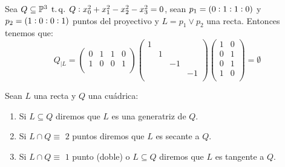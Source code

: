 \begin{example}
  Sea $Q\subseteq \mathbb{P}^3 \operatorname{\;t.q.\;} Q:x^2_0 +x^2_1 -x^2_2-x^2_3=0$, sean $p_1=\left( 0:1:1:0\right)$ y $p_2=\left( 
  1:0:0:1\right)$ puntos del proyectivo y $L=p_1 \vee p_2$ una recta. Entonces tenemos que:
  \[
    Q_{|L}=
    \begin{pmatrix}
      0 & 1 & 1 & 0\\
      1 & 0 & 0 & 1\\
    \end{pmatrix}
    \begin{pmatrix}
      1 & & &\\
      & 1 & &\\
      & & -1 &\\
      & & & -1\\
    \end{pmatrix}
    \begin{pmatrix}
      1 & 0\\
      0 & 1\\
      0 & 1\\
      1 & 0\\
    \end{pmatrix}
    =\emptyset
  \]
  \label{exampleLinQ}
\end{example}

\begin{defi}  
  Sean $L$ una recta y $Q$ una cuádrica:
  \begin{enumerate}[(1)]
    \item Si $L\subseteq Q$ diremos que $L$ es una generatriz de $Q$.
    \item Si $L\cap Q \equiv$ $2$ puntos diremos que $L$ es secante a $Q$.
    \item Si $L\cap Q \equiv$ $1$ punto (doble) o $L \subseteq Q$
    diremos que $L$ es tangente a $Q$.
  \end{enumerate}
\end{defi}

